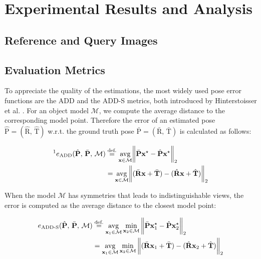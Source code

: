 
\chapter{Experimental Results and Analysis}\label{chapter:presentation_of_the_results}

\section{Reference and Query Images}

\section{Evaluation Metrics}

To appreciate the quality of the estimations, the most widely used pose error functions are the \ac{ADD} and the \ac{ADD-S} metrics, both introduced by Hinterstoisser et al. \cite{10.1007/978-3-642-37331-2_42}. For an object model $\mathcal{M}$, we compute the average distance to the corresponding model point. Therefore the error of an estimated pose $\hat{\bm{\mathrm{P}}}=(\hat{\bm{\mathrm{R}}},\,\hat{\bm{\mathrm{T}}})$ w.r.t. the ground truth pose $\bar{\bm{\mathrm{P}}}=(\bar{\bm{\mathrm{R}}},\,\bar{\bm{\mathrm{T}}})$ is calculated as follows:

\begin{align}
	\textit{\footnotemark}e_\mathrm{ADD}(\hat{\bm{\mathrm{P}}},\,\bar{\bm{\mathrm{P}}},\,\mathcal{M})&\stackrel{\text{def.}}{=}\underset{\bm{\mathrm{x}}\in\mathcal{M}}{\mathrm{avg}}\norm\bigg{\bar{\bm{\mathrm{P}}}\bm{\mathrm{x}}^\star-\hat{\bm{\mathrm{P}}}\bm{\mathrm{x}}^\star}_2 \\
	&=\underset{\bm{\mathrm{x}}\in\mathcal{M}}{\mathrm{avg}}\norm\bigg{(\bar{\bm{\mathrm{R}}}\bm{\mathrm{x}}+\bar{\bm{\mathrm{T}}})-(\hat{\bm{\mathrm{R}}}\bm{\mathrm{x}}+\hat{\bm{\mathrm{T}}})}_2
\end{align}

When the model $\mathcal{M}$ has symmetries that leads to indistinguishable views, the error is computed as the average distance to the closest model point:
 
\begin{align}
	e_{\mathrm{ADD}\text{-}\mathrm{S}}(\hat{\bm{\mathrm{P}}},\,\bar{\bm{\mathrm{P}}},\,\mathcal{M})&\stackrel{\text{def.}}{=} \underset{\bm{\mathrm{x}}_1\in\mathcal{M}}{\mathrm{avg}}\min\limits_{\bm{\mathrm{x}}_2\in\mathcal{M}}\norm\bigg{\bar{\bm{\mathrm{P}}}\bm{\mathrm{x}}_1^\star-\hat{\bm{\mathrm{P}}}\bm{\mathrm{x}}_2^\star}_2 \\
	&=\underset{\bm{\mathrm{x}}_1\in\mathcal{M}}{\mathrm{avg}}\min\limits_{\bm{\mathrm{x}}_2\in\mathcal{M}}\norm\bigg{(\bar{\bm{\mathrm{R}}}\bm{\mathrm{x}}_1+\bar{\bm{\mathrm{T}}})-(\hat{\bm{\mathrm{R}}}\bm{\mathrm{x}}_2+\hat{\bm{\mathrm{T}}})}_2
\end{align}

